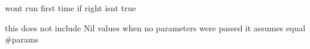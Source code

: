 
\begin{DoxyRefList}
\item[\label{bug__bug000001}%
\hypertarget{bug__bug000001}{}%
Member \hyperlink{classLoop_a661edc5e6b0f90787e2a55922109f110}{Loop\+:\+:execute} (\hyperlink{classEnvironment}{Environment} \&env)]won\textquotesingle{}t run first time if right isn\textquotesingle{}t true  
\item[\label{bug__bug000002}%
\hypertarget{bug__bug000002}{}%
Member \hyperlink{classNode_ad2758f63dc60560b83e1d8a038df6e86}{Node\+:\+:execute} (\hyperlink{classEnvironment}{Environment} \&env)]this does not include Nil values when no parameters were passed it assumes equal \#params 
\end{DoxyRefList}